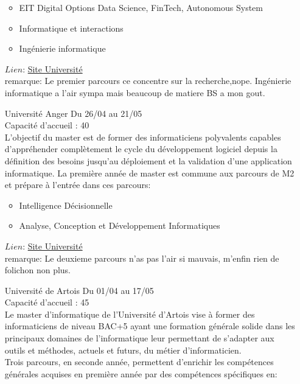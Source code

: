 \documentclass[a4paper,11pt]{article}
\begin{document}
\begin{enumerate}
                \begin{itemize}
                    \item EIT Digital Options Data Science, FinTech, Autonomous System
                    \item Informatique et interactions
                    \item Ingénierie informatique
                \end{itemize}
                $Lien$: \href{https://univ-cotedazur.fr/offre-de-formation/master-informatique-1}{Site Université}
                \\remarque: Le premier parcours ce concentre sur la recherche,nope. Ingénierie informatique a l'air sympa mais beaucoup de matiere BS a mon gout.
\\
        \item [\color{LightOrangeHaf}Université Anger] Du 26/04 au 21/05
                \\Capacité d'accueil : 40
                \\L’objectif du master est de former des informaticiens polyvalents capables d’appréhender complètement le cycle du développement logiciel depuis la définition des besoins jusqu’au déploiement et la validation d’une application informatique. La première année de master est commune aux parcours de M2 et prépare à l'entrée dans ces parcours:
                \begin{itemize}
                    \item Intelligence Décisionnelle
                    \item Analyse, Conception et Développement Informatiques
                \end{itemize}
                $Lien$: \href{http://www.info.univ-angers.fr/dptinfo/}{Site Université}
                \\remarque: Le deuxieme parcours n'as pas l'air si mauvais, m'enfin rien de folichon non plus.
\\
        \item [\color{LightOrangeHaf}Université de Artois] Du 01/04 au 17/05
                \\Capacité d'accueil : 45
                \\Le master d'informatique de l'Université d'Artois vise à former des informaticiens de niveau BAC+5 ayant une formation générale solide dans les principaux domaines de l'informatique leur permettant de s'adapter aux outils et méthodes, actuels et futurs, du métier d'informaticien.\\Trois parcours, en seconde année, permettent d'enrichir les compétences générales acquises en première année par des compétences spécifiques en:

\end{enumerate}
\end{document}
